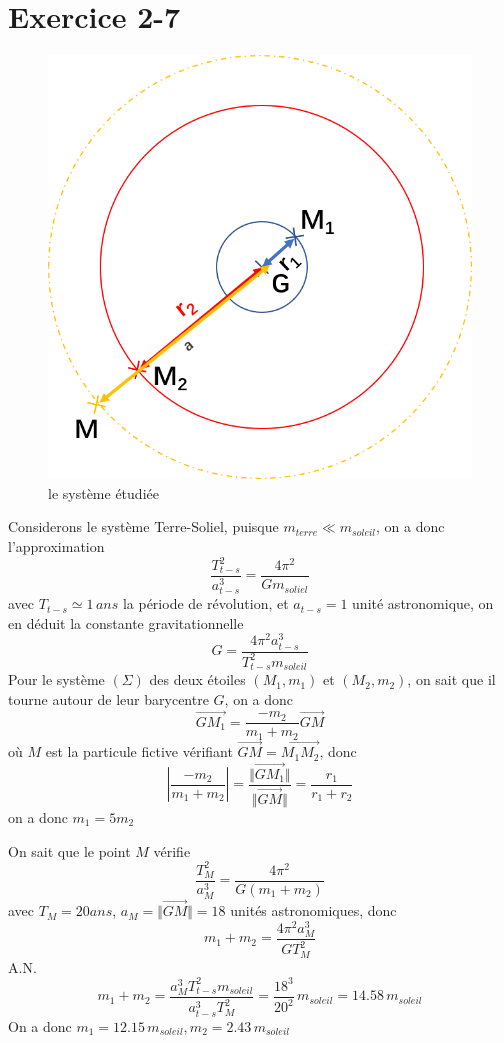 \documentclass[a4paper,12pt]{book}
\begin{document}
\section{Exercice 2-7}
\begin{figure}[h]
    \begin{center}
    \includegraphics[scale=0.6]{meca32.png}
    \end{center}
    \caption{le système étudiée}
\end{figure}
Considerons le système Terre-Soliel, puisque $m_{terre} \ll m_{soleil}$, on a donc l'approximation
$$
\frac{T_{t-s}^2}{a_{t-s}^3}=\frac{4\pi^2}{Gm_{soliel}}
$$
avec $T_{t-s} \simeq 1\,ans$ la période de révolution, et $a_{t-s}= 1$ unité astronomique, 
on en déduit la constante gravitationnelle
$$
G=\frac{4\pi^2a_{t-s}^3}{T_{t-s}^2m_{soleil}}
$$
Pour le système $(\Sigma)$ des deux étoiles $(M_1,m_1)$ et $(M_2,m_2)$, on sait que il tourne autour de leur barycentre $G$, 
on a donc 
$$
\overrightarrow{GM_1}=\frac{-m_2}{m_1+m_2}\overrightarrow{GM}
$$
où $M$ est la particule fictive vérifiant $\overrightarrow{GM}=\overrightarrow{M_1M_2}$, donc 
$$
|\frac{-m_2}{m_1+m_2}|=\frac{\Vert\overrightarrow{GM_1}\Vert}{\Vert\overrightarrow{GM}\Vert}=\frac{r_1}{r_1+r_2}
$$
on a donc $m_1=5m_2$

On sait que le point $M$ vérifie 
$$
\frac{T_{M}^2}{a_{M}^3}=\frac{4\pi^2}{G(m_1+m_2)}
$$
avec $T_{M}=20ans$, $a_{M}=\Vert\overrightarrow{GM}\Vert=18$ unités astronomiques, donc 
$$
m_1+m_2=\frac{4\pi^2a_{M}^3}{GT_{M}^2}
$$
A.N.
$$
m_1+m_2=\frac{a_{M}^3T_{t-s}^2m_{soleil}}{a_{t-s}^3T_{M}^2}=\frac{18^3}{20^2}\,m_{soleil}=14.58\,m_{soleil}
$$
On a donc $\boxed{m_1=12.15\,m_{soleil}, m_2=2.43\,m_{soleil}}$
\end{document}
